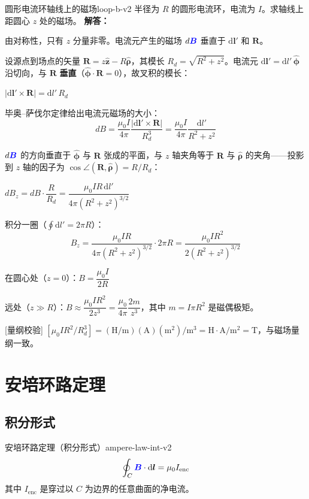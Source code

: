 \documentclass[11pt,a4paper,openany,oneside]{book}
\newcommand{\diff}{\mathrm{d}}
\newcommand{\vecB}{\textcolor{blue}{\vect{B}}}
\newcommand{\muz}{\mu_0}
\newcommand{\vect}[1]{\bm{#1}}
\newcommand{\unitvec}[1]{\hat{\vect{#1}}}
\newcommand{\difficulty}[1]{\marginnote{\textcolor{red}{\textbf{[#1]}}}}
\begin{document}
\begin{example}{圆形电流环轴线上的磁场}{loop-b-v2}
\difficulty{提高}
半径为 $R$ 的圆形电流环，电流为 $I$。求轴线上距圆心 $z$ 处的磁场。
\tcblower
\textbf{解答：}

由对称性，只有 $z$ 分量非零。电流元产生的磁场 $d\vecB$ 垂直于 $\diff\vect{l}'$ 和 $\vect{R}$。

设源点到场点的矢量 $\vect{R} = z\unitvec{z} - R\unitvec{\rho}$，其模长 $R_{\!d} = \sqrt{R^2+z^2}$。电流元 $\diff\vect{l}' = \diff l'\,\unitvec{\phi}$ 沿切向，与 $\vect{R}$ \textbf{垂直}（$\unitvec{\phi}\cdot\vect{R} = 0$），故叉积的模长：

$|\diff\vect{l}' \times \vect{R}| = \diff l'\, R_{\!d}$

毕奥--萨伐尔定律给出电流元磁场的大小：
\[
dB = \dfrac{\muz I}{4\pi} \dfrac{|\diff\vect{l}' \times \vect{R}|}{R_{\!d}^3} = \dfrac{\muz I}{4\pi} \dfrac{\diff l'}{R^2+z^2}
\]

$d\vecB$ 的方向垂直于 $\unitvec{\phi}$ 与 $\vect{R}$ 张成的平面，与 $z$ 轴夹角等于 $\vect{R}$ 与 $\unitvec{\rho}$ 的夹角——投影到 $z$ 轴的因子为 $\cos\angle(\vect{R},\unitvec{\rho}) = R/R_{\!d}$：

$dB_z = dB \cdot \dfrac{R}{R_{\!d}} = \dfrac{\muz I R\,\diff l'}{4\pi(R^2+z^2)^{3/2}}$

积分一圈（$\oint\diff l' = 2\pi R$）：
\[
B_z = \frac{\muz I R}{4\pi(R^2+z^2)^{3/2}} \cdot 2\pi R = \frac{\muz I R^2}{2(R^2+z^2)^{3/2}}
\]

在圆心处（$z=0$）：$B = \dfrac{\muz I}{2R}$

远处（$z \gg R$）：$B \approx \dfrac{\muz I R^2}{2z^3} = \dfrac{\muz}{4\pi} \dfrac{2m}{z^3}$，其中 $m = I\pi R^2$ 是磁偶极矩。

[量纲校验] $[\muz I R^2/R_{\!d}^3] = (\mathrm{H/m})(\mathrm{A})(\mathrm{m^2})/\mathrm{m^3} = \mathrm{H\cdot A/m^2} = \mathrm{T}$，与磁场量纲一致。\checkmark
\end{example}

\section{安培环路定理}

\subsection{积分形式}

\begin{theorem}{安培环路定理（积分形式）}{ampere-law-int-v2}
\[
\oint_C \vecB \cdot \diff\vect{l} = \muz I_{\text{enc}}
\]
其中 $I_{\text{enc}}$ 是穿过以 $C$ 为边界的任意曲面的净电流。
\end{theorem}
\end{document}
